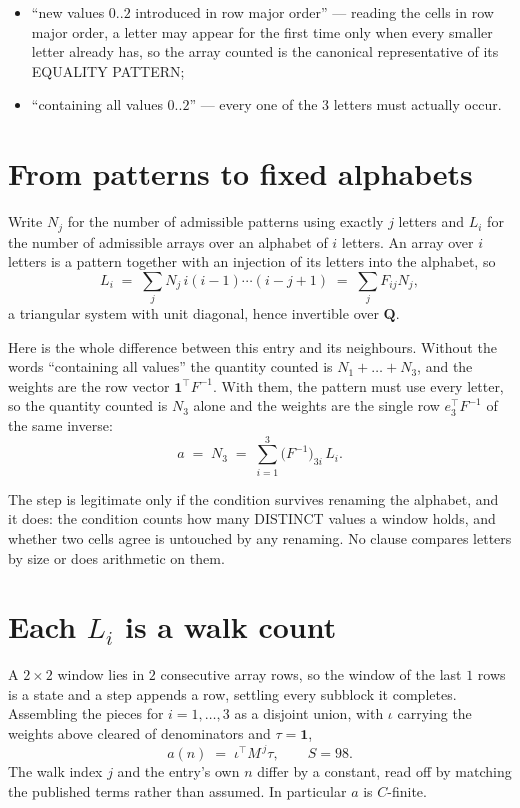 \documentclass[11pt,a4paper]{article}
\theoremstyle{plain}
\theoremstyle{definition}
\begin{document}
\begin{itemize}
\item ``new values $0..2$ introduced in row major order'' --- reading the cells in row major
order, a letter may appear for the first time only when every smaller letter already has, so
the array counted is the canonical representative of its EQUALITY PATTERN;
\item ``containing all values $0..2$'' --- every one of the $3$ letters must actually
occur.
\end{itemize}


\section{From patterns to fixed alphabets}

Write $N_j$ for the number of admissible patterns using exactly $j$ letters and $L_i$ for the
number of admissible arrays over an alphabet of $i$ letters. An array over $i$ letters is a
pattern together with an injection of its letters into the alphabet, so
\[
L_i\;=\;\sum_{j} N_j\,i(i-1)\cdots(i-j+1)\;=\;\sum_j F_{ij}N_j ,
\]
a triangular system with unit diagonal, hence invertible over $\mathbf{Q}$.

Here is the whole difference between this entry and its neighbours. Without the words
``containing all values'' the quantity counted is $N_1+\dots+N_{3}$, and the weights are
the row vector $\mathbf{1}^{\!\top}F^{-1}$. With them, the pattern must use every letter,
so the quantity counted is $N_{3}$ alone and the weights are the single row
$e_{3}^{\!\top}F^{-1}$ of the same inverse:
\[
a\;=\;N_{3}\;=\;\sum_{i=1}^{3}\bigl(F^{-1}\bigr)_{3i}\,L_i .
\]

The step is legitimate only if the condition survives renaming the alphabet, and it does: the
condition counts how many DISTINCT values a window holds, and whether two cells agree is
untouched by any renaming. No clause compares letters by size or does arithmetic on them.

\section{Each $L_i$ is a walk count}

A $2\times2$ window lies in $2$ consecutive array rows, so the window of the last
$1$ rows is a state and a step appends a row, settling every subblock it completes.
Assembling the pieces for $i=1,\dots,3$ as a disjoint union, with $\iota$ carrying the
weights above cleared of denominators and $\tau=\mathbf{1}$,
\[
a(n)\;=\;\iota^{\!\top}M^{\,j}\tau ,\qquad S=98.
\]
The walk index $j$ and the entry's own $n$ differ by a constant, read off by matching the
published terms rather than assumed. In particular $a$ is $C$-finite.
\end{document}
